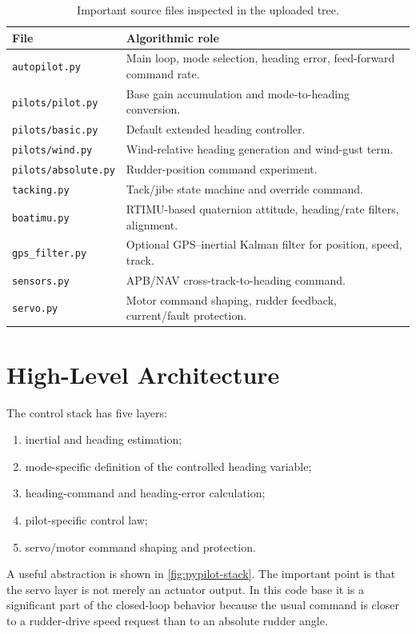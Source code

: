 \documentclass[11pt,twocolumn]{article}
\begin{document}
\begin{table}[h]
\centering
\caption{Important source files inspected in the uploaded tree.}
\label{tab:source-files}
\begin{tabularx}{\columnwidth}{@{}Z{0.34\columnwidth}Y@{}}
\toprule
File & Algorithmic role \\
\midrule
\texttt{autopilot.py} & Main loop, mode selection, heading error, feed-forward command rate. \\
\texttt{pilots/pilot.py} & Base gain accumulation and mode-to-heading conversion. \\
\texttt{pilots/basic.py} & Default extended heading controller. \\
\texttt{pilots/wind.py} & Wind-relative heading generation and wind-gust term. \\
\texttt{pilots/absolute.py} & Rudder-position command experiment. \\
\texttt{tacking.py} & Tack/jibe state machine and override command. \\
\texttt{boatimu.py} & RTIMU-based quaternion attitude, heading/rate filters, alignment. \\
\texttt{gps\_filter.py} & Optional GPS--inertial Kalman filter for position, speed, track. \\
\texttt{sensors.py} & APB/NAV cross-track-to-heading command. \\
\texttt{servo.py} & Motor command shaping, rudder feedback, current/fault protection. \\
\bottomrule
\end{tabularx}
\end{table}

\section{High-Level Architecture}

The control stack has five layers:
\begin{enumerate}
\item inertial and heading estimation;
\item mode-specific definition of the controlled heading variable;
\item heading-command and heading-error calculation;
\item pilot-specific control law;
\item servo/motor command shaping and protection.
\end{enumerate}

A useful abstraction is shown in \cref{fig:pypilot-stack}.  The important point is that
the servo layer is not merely an actuator output.  In this code base it is a significant
part of the closed-loop behavior because the usual command is closer to a rudder-drive
speed request than to an absolute rudder angle.
\end{document}
